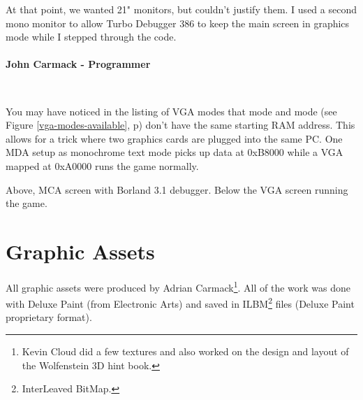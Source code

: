 \documentclass[book.tex]{subfiles}
\begin{document}
\begin{fancyquotes}
At that point, we wanted 21" monitors, but couldn't justify them.  I used a second mono monitor to allow Turbo Debugger 386 to keep the main screen in graphics mode while I stepped through the code.\\
 \\
\textbf{John Carmack - Programmer}
\end{fancyquotes}\\
\par
You may have noticed in the listing of VGA modes that mode  and mode  (see Figure \ref{vga-modes-available}, p\pageref{vga-modes-available})  don't have the same starting RAM address. This allows for a trick where two graphics cards are plugged into the same PC. One MDA setup as monochrome text mode picks up data at 0xB8000 while a VGA mapped at 0xA0000 runs the game normally.
      \\
      \par
Above, MCA screen with Borland 3.1 debugger. Below the VGA screen running the game.\\




 
 
 




\section{Graphic Assets}

All graphic assets were produced by Adrian Carmack\footnote{Kevin Cloud did a few textures and also worked on the design and layout of the Wolfenstein 3D hint book.}. All of the work was done with Deluxe Paint (from Electronic Arts) and saved in ILBM\footnote{InterLeaved BitMap.} files (Deluxe Paint proprietary format). 
\end{document}
